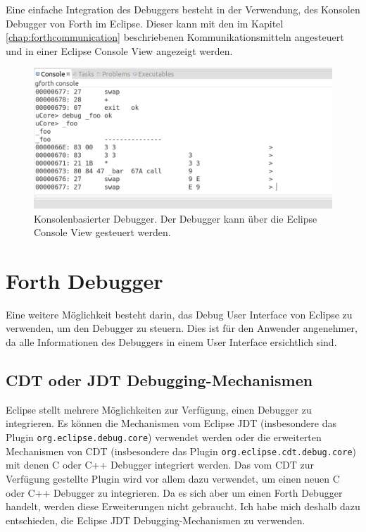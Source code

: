 Eine einfache Integration des Debuggers besteht in der Verwendung, des Konsolen Debugger von Forth im Eclipse. Dieser kann mit den im Kapitel \ref{chap:forthcommunication} beschriebenen Kommunikationsmitteln angesteuert und in einer Eclipse Console View angezeigt werden.

\begin{figure}[H]
	\centering
		\includegraphics[scale=0.35]{debugger/consoledebugger.png}
		\caption{Konsolenbasierter Debugger. Der Debugger kann über die Eclipse Console View gesteuert werden.}
		\label{fig:consoledebugger}
\end{figure}

\section{Forth Debugger}

Eine weitere Möglichkeit besteht darin, das Debug User Interface von Eclipse zu verwenden, um den Debugger zu steuern. Dies ist für den Anwender angenehmer, da alle Informationen des Debuggers in einem User Interface ersichtlich sind.

\subsection{CDT oder JDT Debugging-Mechanismen}

Eclipse stellt mehrere Möglichkeiten zur Verfügung, einen Debugger zu integrieren. Es können die Mechanismen vom Eclipse JDT (insbesondere das Plugin \verb!org.eclipse.debug.core!) verwendet werden oder die erweiterten Mechanismen von CDT (insbesondere das Plugin \verb!org.eclipse.cdt.debug.core!) mit denen C oder C++ Debugger integriert werden. Das vom CDT zur Verfügung gestellte Plugin wird vor allem dazu verwendet, um einen neuen C oder C++ Debugger zu integrieren. Da es sich aber um einen Forth Debugger handelt, werden diese Erweiterungen nicht gebraucht. Ich habe mich deshalb dazu entschieden, die Eclipse JDT Debugging-Mechanismen zu verwenden.

